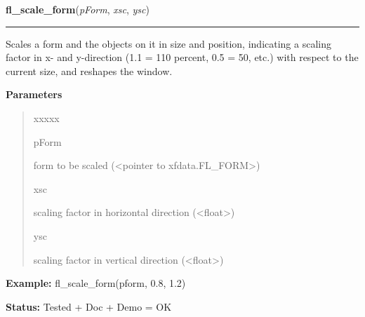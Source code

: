 \hspace{.8\funcindent}\begin{boxedminipage}{\funcwidth}

    \raggedright \textbf{fl\_scale\_form}(\textit{pForm}, \textit{xsc}, \textit{ysc})

    \vspace{-1.5ex}

    \rule{\textwidth}{0.5\fboxrule}
\setlength{\parskip}{2ex}
    Scales a form and the objects on it in size and position, indicating a 
    scaling factor in x- and y-direction (1.1 = 110 percent, 0.5 = 50, 
    etc.) with respect to the current size, and reshapes the window.

\setlength{\parskip}{1ex}
      \textbf{Parameters}
      \vspace{-1ex}

      \begin{quote}
        \begin{Ventry}{xxxxx}

          \item[pForm]

          form to be scaled ({\textless}pointer to 
          xfdata.FL\_FORM{\textgreater})

          \item[xsc]

          scaling factor in horizontal direction 
          ({\textless}float{\textgreater})

          \item[ysc]

          scaling factor in vertical direction 
          ({\textless}float{\textgreater})

        \end{Ventry}

      \end{quote}

\textbf{Example:} fl\_scale\_form(pform, 0.8, 1.2)



\textbf{Status:} Tested + Doc + Demo = OK



    \end{boxedminipage}

    \label{xformslib:library:fl_set_form_position}

    \vspace{0.5ex}

